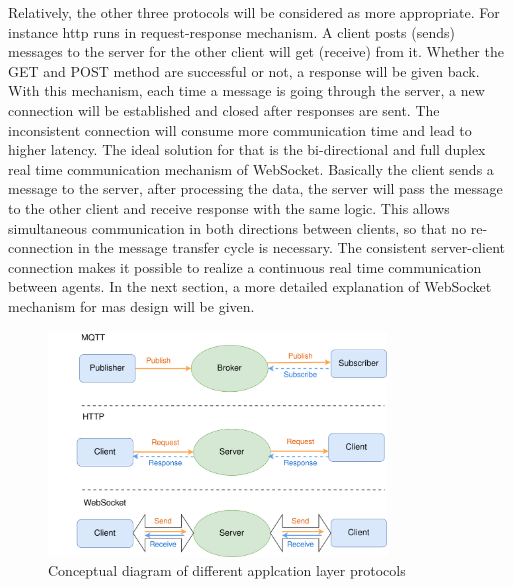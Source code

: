 Relatively, the other three protocols will be considered as more appropriate. 
For instance \gls{http} runs in request-response mechanism. 
A client posts (sends) messages to the server for the other client will get (receive) from it. 
Whether the GET and POST method are successful or not, a response will be given back. With this mechanism, each time a message is going through the server, a new connection will be established and closed after responses are sent. 
The inconsistent connection will consume more communication time and lead to higher latency. 
The ideal solution for that is the bi-directional and full duplex real time communication mechanism of WebSocket. 
Basically the client sends a message to the server, after processing the data, the server will pass the message to the other client and receive response with the same logic. This allows simultaneous communication in both directions between clients, so that no re-connection in the message transfer cycle is necessary. The consistent server-client connection makes it possible to realize a continuous real time communication between agents. In the next section, a more detailed explanation of WebSocket mechanism for \gls{mas} design will be given.

\begin{figure}[htb]
\includegraphics[width=0.8\textwidth]{figures/MessageConceptual.png}
\centering
\caption{Conceptual diagram of different applcation layer 
protocols\label{fig: MsgConceptual}}
\end{figure}

